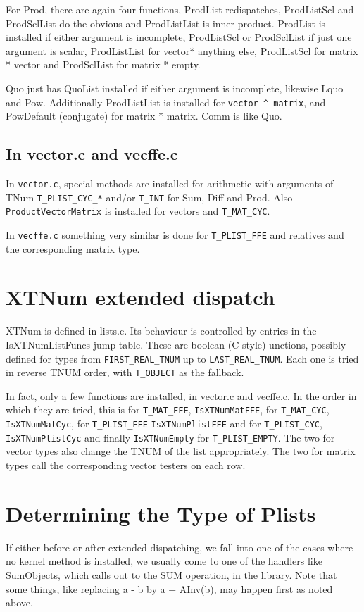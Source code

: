 \documentclass{article}
\begin{document}
For Prod, there are again four functions, ProdList redispatches,
ProdListScl and ProdSclList do the obvious and ProdListList is inner
product. ProdList is installed if either argument is incomplete,
ProdListScl or ProdSclList if just one argument is scalar,
ProdListList for vector* anything else, ProdListScl
for matrix * vector and ProdSclList for matrix * empty. 

Quo just has QuoList installed if either argument is incomplete,
likewise Lquo and Pow. Additionally ProdListList is installed for
\verb|vector ^ matrix|, and PowDefault (conjugate) for matrix * matrix. Comm
is like Quo.

\subsection{In vector.c and vecffe.c}

In \verb|vector.c|, special methods are installed for arithmetic with
arguments of TNum \verb|T_PLIST_CYC_*| and/or \verb|T_INT| for Sum, Diff and
Prod. Also \verb|ProductVectorMatrix| is installed for vectors and
\verb|T_MAT_CYC|.

In \verb|vecffe.c| something very similar is done for
\verb|T_PLIST_FFE| and relatives and the corresponding matrix type.



\section{XTNum extended dispatch}

XTNum is defined in lists.c. Its behaviour is controlled by entries
in the IsXTNumListFuncs jump table. These are boolean (C style)
unctions, possibly defined for types from \verb|FIRST_REAL_TNUM| up to
\verb|LAST_REAL_TNUM|. Each one is tried in reverse TNUM order, with
\verb|T_OBJECT| as the fallback.

In fact, only a few functions are installed, in vector.c and
vecffe.c. In the order in which they are tried, this is for \verb|T_MAT_FFE|,
\verb|IsXTNumMatFFE|, for \verb|T_MAT_CYC|, \verb|IsXTNumMatCyc|, for \verb|T_PLIST_FFE|
\verb|IsXTNumPlistFFE| and for \verb|T_PLIST_CYC|, \verb|IsXTNumPlistCyc| and finally
\verb|IsXTNumEmpty| for \verb|T_PLIST_EMPTY|. The two for vector types also change
the TNUM of the list appropriately. The two for matrix types call the
corresponding vector testers on each row.

\section{Determining the Type of Plists}
If either before or after extended dispatching, we fall into one of
the cases where no kernel method is installed, we usually come to one
of the handlers like SumObjects, which calls out to the SUM operation,
in the library. Note that some things, like replacing a - b by a +
AInv(b), may happen first as noted above.
\end{document}
